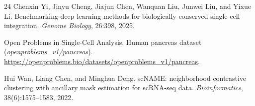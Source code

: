 \documentclass[11pt,a4paper]{article}
\begin{document}
\begin{thebibliography}{24}
Chenxin Yi, Jinyu Cheng, Jiajun Chen, Wanquan Liu, Junwei Liu, and Yixue Li.
\newblock Benchmarking deep learning methods for biologically conserved single-cell integration.
\newblock \textit{Genome Biology}, 26:398, 2025.

Open Problems in Single-Cell Analysis.
\newblock Human pancreas dataset (\textit{openproblems\_v1/pancreas}).
\newblock \url{https://openproblems.bio/datasets/openproblems_v1/pancreas}.

Hui Wan, Liang Chen, and Minghua Deng.
\newblock scNAME: neighborhood contrastive clustering with ancillary mask estimation for scRNA-seq data.
\newblock \textit{Bioinformatics}, 38(6):1575--1583, 2022.


\end{thebibliography}
\endgroup
\end{document}
